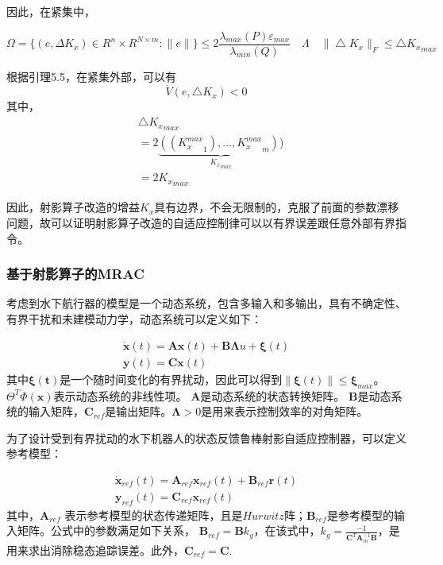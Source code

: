 因此，在紧集中，

\begin{equation}
\Omega = \{(e,\Delta K_x) \in R^n \times R^{N \times m}: \|e \| \} \leq 2\frac{\lambda_{max}(P) \varepsilon_{max}}{\lambda_{min}(Q)} \quad \Lambda \quad  \| \bigtriangleup K_x \|_F \leq \bigtriangleup {K_x}_{max}
\end{equation}

根据引理5.5，在紧集外部，可以有
\begin{equation}
\dot  V (e, \bigtriangleup K_x) < 0
\end{equation}
其中，
\begin{equation}
\begin{aligned}
&\bigtriangleup {K_x}_{max} \\
&= 2\underbrace{(({K_x^{max}}_1) ,..., {K_x^{max}}_{m}))}_{{K_x}_{max}}\\
& = 2 {K_x}_{max}
\end{aligned}
\end{equation}

因此，射影算子改造的增益$K_x$具有边界，不会无限制的，克服了前面的参数漂移问题，故可以证明射影算子改造的自适应控制律可以以有界误差跟任意外部有界指令。



\subsubsection{基于射影算子的MRAC }

考虑到水下航行器的模型是一个动态系统，包含多输入和多输出，具有不确定性、有界干扰和未建模动力学，动态系统可以定义如下：

\begin{equation}
\label{eq012}
\begin{array}{l}
\dot{\bm{x}}(t) = \bm{A} \bm{x}(t)+ \bm{B} \bm{\Lambda}u + \bm{\xi} (t)\\
\bm{y}(t) = \bm{C}\bm{x} (t)
\end{array}
\end{equation}
其中$\bm{\xi(t)}$是一个随时间变化的有界扰动，因此可以得到$\left \| \bm{\xi}(t) \right \| \leq \bm{\xi}_{max}$。 $\Theta ^{T}\Phi (\bm{x})$表示动态系统的非线性项。 $\bm{A}$是动态系统的状态转换矩阵。 $\bm{B}$是动态系统的输入矩阵，$\bm{C}_{ref}$是输出矩阵。$\bm{\Lambda} > 0$是用来表示控制效率的对角矩阵。

为了设计受到有界扰动的水下机器人的状态反馈鲁棒射影自适应控制器，可以定义参考模型：

\begin{equation}
\label{eq013}
\begin{array}{l}
\bm{\dot x}_{ref} (t)= \bm{A}_{ref}\bm{x}_{ref}(t)+\bm{B}_{ref}\bm{r}(t) \\
\bm{y}_{ref}(t) = \bm{C}_{ref}\bm{x}_{ref}(t)
\end{array}
\end{equation}
其中，$\bm{A}_{ref}$ 表示参考模型的状态传递矩阵，且是$Hurwitz$阵；$\bm{B}_{ref}$是参考模型的输入矩阵。公式中的参数满足如下关系，
$\bm{B}_{ref} = \bm{B}k_g$，在该式中，$k_g = {}\frac{-1}{\bm{C}^T \bm{A}_m^{-1} \bm{B}}$，是用来求出消除稳态追踪误差。此外，$\bm{C}_{ref} = \bm{C}$.

